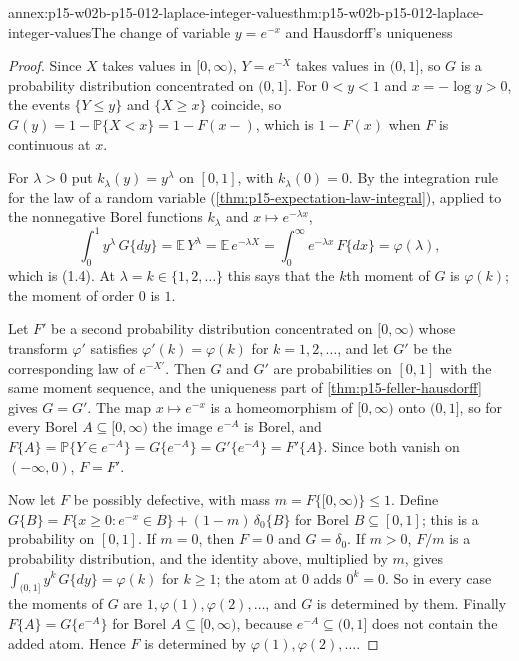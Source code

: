 \begin{annexitem}{annex:p15-w02b-p15-012-laplace-integer-values}{thm:p15-w02b-p15-012-laplace-integer-values}{The change of variable \(y=e^{-x}\) and Hausdorff's uniqueness}
\begin{proof}
Since \(X\) takes values in \([0,\infty)\), \(Y=e^{-X}\) takes values in
\((0,1]\), so \(G\) is a probability distribution concentrated on \((0,1]\).
For \(0<y<1\) and \(x=-\log y>0\), the events \(\{Y\leq y\}\) and
\(\{X\geq x\}\) coincide, so \(G(y)=1-\mathbb P\{X<x\}=1-F(x-)\), which is
\(1-F(x)\) when \(F\) is continuous at \(x\).

For \(\lambda>0\) put \(k_\lambda(y)=y^\lambda\) on \([0,1]\), with
\(k_\lambda(0)=0\). By the integration rule for the law of a random variable
(\cref{thm:p15-expectation-law-integral}), applied to the nonnegative Borel
functions \(k_\lambda\) and \(x\mapsto e^{-\lambda x}\),
\[
 \int_0^1y^\lambda\,G\{dy\}=\mathbb E\,Y^\lambda=\mathbb E\,e^{-\lambda X}
   =\int_0^\infty e^{-\lambda x}\,F\{dx\}=\varphi(\lambda),
\]
which is (1.4). At \(\lambda=k\in\{1,2,\ldots\}\) this says that the \(k\)th
moment of \(G\) is \(\varphi(k)\); the moment of order \(0\) is \(1\).

Let \(F'\) be a second probability distribution concentrated on
\([0,\infty)\) whose transform \(\varphi'\) satisfies \(\varphi'(k)=\varphi(k)\)
for \(k=1,2,\ldots\), and let \(G'\) be the corresponding law of
\(e^{-X'}\). Then \(G\) and \(G'\) are probabilities on \([0,1]\) with the same
moment sequence, and the uniqueness part of
\cref{thm:p15-feller-hausdorff} gives \(G=G'\). The map
\(x\mapsto e^{-x}\) is a homeomorphism of \([0,\infty)\) onto \((0,1]\), so for
every Borel \(A\subseteq[0,\infty)\) the image \(e^{-A}\) is Borel, and
\(F\{A\}=\mathbb P\{Y\in e^{-A}\}=G\{e^{-A}\}=G'\{e^{-A}\}=F'\{A\}\). Since
both vanish on \((-\infty,0)\), \(F=F'\).

Now let \(F\) be possibly defective, with mass \(m=F\{[0,\infty)\}\leq1\).
Define \(G\{B\}=F\{x\geq0:e^{-x}\in B\}+(1-m)\,\delta_0\{B\}\) for Borel
\(B\subseteq[0,1]\); this is a probability on \([0,1]\). If \(m=0\), then
\(F=0\) and \(G=\delta_0\). If \(m>0\), \(F/m\) is a probability distribution,
and the identity above, multiplied by \(m\), gives
\(\int_{(0,1]}y^k\,G\{dy\}=\varphi(k)\) for \(k\geq1\); the atom at \(0\) adds
\(0^k=0\). So in every case the moments of \(G\) are \(1,\varphi(1),\varphi(2),\ldots\),
and \(G\) is determined by them. Finally
\(F\{A\}=G\{e^{-A}\}\) for Borel \(A\subseteq[0,\infty)\), because
\(e^{-A}\subseteq(0,1]\) does not contain the added atom. Hence \(F\) is
determined by \(\varphi(1),\varphi(2),\ldots\).
\end{proof}
\end{annexitem}

